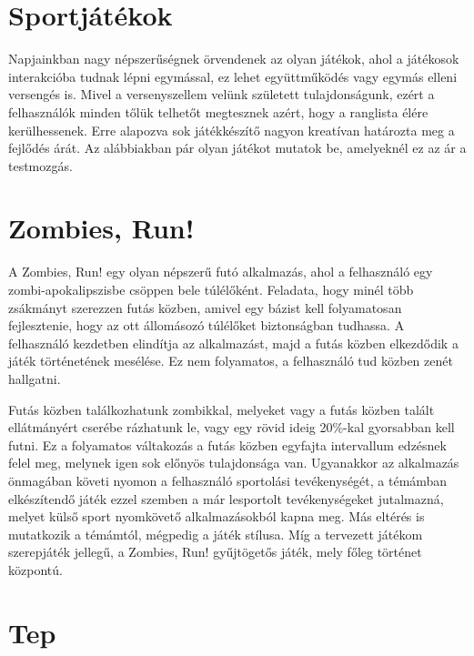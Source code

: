 \section{Sportjátékok}
\label{sportjatekok}

Napjainkban nagy népszerűségnek örvendenek az olyan játékok, ahol a játékosok interakcióba tudnak lépni egymással, ez lehet együttműködés vagy egymás elleni versengés is. 
Mivel a versenyszellem velünk született tulajdonságunk, ezért a felhasználók minden tőlük telhetőt megtesznek azért, hogy a ranglista élére kerülhessenek. 
Erre alapozva sok játékkészítő nagyon kreatívan határozta meg a fejlődés árát. 
Az alábbiakban pár olyan játékot mutatok be, amelyeknél ez az ár a testmozgás. 

\section*{Zombies, Run!}
\label{zombiesrun}

A Zombies, Run! egy olyan népszerű futó alkalmazás, ahol a felhasználó egy zombi-apokalipszisbe csöppen bele túlélőként. 
Feladata, hogy minél több zsákmányt szerezzen futás közben, amivel egy bázist kell folyamatosan fejlesztenie, hogy az ott állomásozó túlélőket biztonságban tudhassa. 
A felhasználó kezdetben elindítja az alkalmazást, majd a futás közben elkezdődik a játék történetének mesélése. 
Ez nem folyamatos, a felhasználó tud közben zenét hallgatni. 

Futás közben találkozhatunk zombikkal, melyeket vagy a futás közben talált ellátmányért cserébe rázhatunk le, vagy egy rövid ideig 20\%-kal gyorsabban kell futni. 
Ez a folyamatos váltakozás a futás közben egyfajta intervallum edzésnek felel meg, melynek igen sok előnyös tulajdonsága van. 
Ugyanakkor az alkalmazás önmagában követi nyomon a felhasználó sportolási tevékenységét, a témámban elkészítendő játék ezzel szemben a már lesportolt tevékenységeket jutalmazná, melyet külső sport nyomkövető alkalmazásokból kapna meg. 
Más eltérés is mutatkozik a témámtól, mégpedig a játék stílusa. 
Míg a tervezett játékom szerepjáték jellegű, a Zombies, Run! gyűjtögetős játék, mely főleg történet központú. 

\section*{Tep}
\label{tep}

